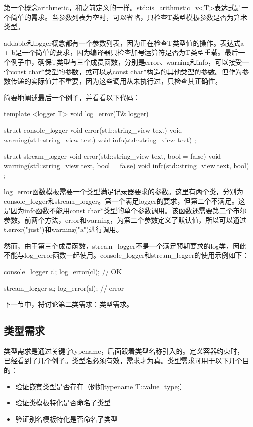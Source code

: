 第一个概念arithmetic，和之前定义的一样。std::is_arithmetic_v<T>表达式是一个简单的需求。当参数列表为空时，可以省略，只检查T类型模板参数是否为算术类型。

addable和logger概念都有一个参数列表，因为正在检查T类型值的操作。表达式a + b是一个简单的要求，因为编译器只检查加号运算符是否为T类型重载。最后一个例子中，确保T类型有三个成员函数，分别是error、warning和info，可以接受一个const char*类型的参数，或可以从const char*构造的其他类型的参数。但作为参数传递的实际值并不重要，因为这些调用从未执行过，只检查其正确性。

简要地阐述最后一个例子，并看看以下代码：

\begin{cppcode}
template <logger T>
void log_error(T& logger)
{}

struct console_logger
{
	void error(std::string_view text){}
	void warning(std::string_view text) {}
	void info(std::string_view text) {}
};

struct stream_logger
{
	void error(std::string_view text, bool = false) {}
	void warning(std::string_view text, bool = false) {}
	void info(std::string_view text, bool) {}
};
\end{cppcode}

log_error函数模板需要一个类型满足记录器要求的参数。这里有两个类，分别为console_logger和stream_logger。第一个满足logger的要求，但第二个不满足。这是因为info函数不能用const char*类型的单个参数调用。该函数还需要第二个布尔参数。前两个方法，error和warning，为第二个参数定义了默认值，所以可以通过t.error("just")和warning("a")进行调用。

然而，由于第三个成员函数，stream_logger不是一个满足预期要求的log类，因此不能与log_error函数一起使用。console_logger和stream_logger的使用示例如下：

\begin{cppcode}
console_logger cl;
log_error(cl); // OK

stream_logger sl;
log_error(sl); // error
\end{cppcode}

下一节中，将讨论第二类需求：类型需求。

\subsection{类型需求}

类型需求是通过关键字typename，后面跟着类型名称引入的。定义容器约束时，已经看到了几个例子。类型名必须有效，需求才为真。类型需求可用于以下几个目的：

\begin{itemize}
  \item 验证嵌套类型是否存在（例如typename T::value_type;）
  \item 验证类模板特化是否命名了类型
  \item 验证别名模板特化是否命名了类型
\end{itemize}

